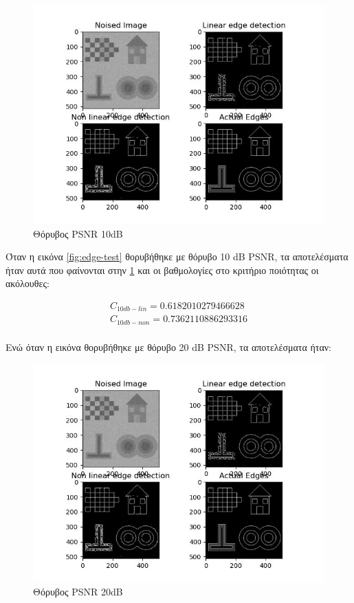 \documentclass{article}
\newcommand{\eng}[1]{\foreignlanguage{english}{#1}}
\begin{document}
\begin{figure}[h!]
    \includegraphics[width=\textwidth]{image-plots/edges-intro0.jpg}
    \caption{Θόρυβος \eng{PSNR} 10\eng{dB}}
    \label{fig:noise 10db}
\end{figure}
\FloatBarrier

Όταν η εικόνα \ref{fig:edge-test} θορυβήθηκε με θόρυβο 10 \eng{dB PSNR}, τα αποτελέσματα ήταν αυτά που φαίνονται στην \ref{fig:noise 10db} και οι βαθμολογίες στο κριτήριο ποιότητας οι ακόλουθες:

\begin{equation}
    \begin{gathered}
        C_{10db-lin} = 0.6182010279466628\\
        C_{10db-non} = 0.7362110886293316\\
    \end{gathered}
\end{equation}

Ενώ όταν η εικόνα θορυβήθηκε με θόρυβο 20 \eng{dB PSNR}, τα αποτελέσματα ήταν:

\begin{figure}[h]
        \includegraphics[width=\textwidth]{image-plots/edges-intro0.jpg}
        \caption{Θόρυβος \eng{PSNR} 20\eng{dB}}
\end{figure}
\FloatBarrier
\end{document}
